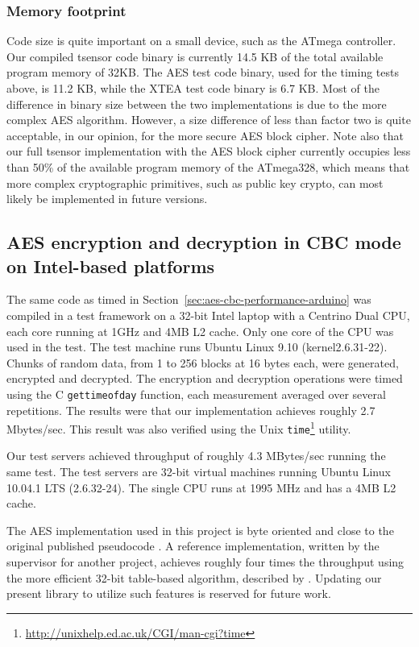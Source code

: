 \subsubsection*{Memory footprint}

Code size is quite important on a small device, such as the ATmega controller. Our compiled tsensor code binary is currently 14.5 KB of the total available program memory of 32KB. The AES test code binary, used for the timing tests above, is 11.2 KB, while the XTEA test code binary is 6.7 KB. Most of the difference in binary size between the two implementations is due to the more complex AES algorithm. However, a size difference of less than factor two is quite acceptable, in our opinion, for the more secure AES block cipher. Note also that our full tsensor implementation with the AES block cipher currently occupies less than 50\% of the available program memory of the ATmega328, which means that more complex cryptographic primitives, such as public key crypto, can most likely be implemented in future versions.

\subsection{AES encryption and decryption in CBC mode on Intel-based platforms}

The same code as timed in Section~\ref{sec:aes-cbc-performance-arduino} was compiled in a test framework on a 32-bit Intel laptop with a Centrino Dual CPU, each core running at 1GHz and 4MB L2 cache. Only one core of the CPU was used in the test. The test machine runs Ubuntu Linux 9.10 (kernel2.6.31-22). Chunks of random data, from 1 to 256 blocks at 16 bytes each, were generated, encrypted and decrypted. The encryption and decryption operations were timed using the C \texttt{gettimeofday} function, each measurement averaged over several repetitions. The results were that our implementation achieves roughly 2.7 Mbytes/sec. This result was also verified using the Unix \texttt{time}\footnote{\url{http://unixhelp.ed.ac.uk/CGI/man-cgi?time}} utility.

Our test servers achieved throughput of roughly 4.3 MBytes/sec running the same test. The test servers are 32-bit virtual machines running Ubuntu Linux 10.04.1 LTS (2.6.32-24). The single CPU runs at 1995 MHz and has a 4MB L2 cache.

The AES implementation used in this project is byte oriented and close to the original published pseudocode . A reference implementation, written by the supervisor for another project, achieves roughly four times the throughput using the more efficient 32-bit table-based algorithm, described by . Updating our present library to utilize such features is reserved for future work.

